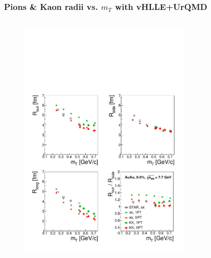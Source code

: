 \documentclass[dvipsnames] {beamer}
\begin{document}
      \begin{frame}
        \bf
        \frametitle{\bf \centering Pions \& Kaon radii vs. $m_{T}$ with vHLLE+UrQMD}
        \vskip -0.5cm
        \begin{columns}[t]
          \begin{figure}[H]
            \includegraphics[width=1.0\linewidth]{AuAu_077.pdf}
          \end{figure}
           \begin{figure}[H]

\end{figure}
\end{columns}
\end{frame}
\end{document}
